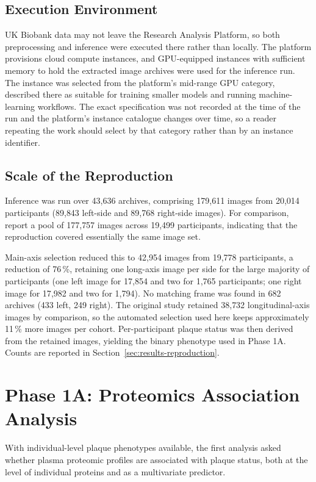 \subsection{Execution Environment}
UK Biobank data may not leave the Research Analysis Platform, so both preprocessing and inference
were executed there rather than locally. The platform provisions cloud compute instances, and
GPU-equipped instances with sufficient memory to hold the extracted image archives were used for
the inference run.
The instance was selected from the platform's mid-range GPU category, described there as
suitable for training smaller models and running machine-learning workflows. The exact
specification was not recorded at the time of the run and the platform's instance catalogue
changes over time, so a reader repeating the work should select by that category rather than by
an instance identifier.

\subsection{Scale of the Reproduction}
\label{subsec:reproduction-scale}
Inference was run over 43{,}636 archives, comprising 179{,}611 images from 20{,}014 participants
(89{,}843 left-side and 89{,}768 right-side images). For comparison, \textcite{omarov2024deep}
report a pool of 177{,}757 images across 19{,}499 participants, indicating that the reproduction
covered essentially the same image set.

Main-axis selection reduced this to 42{,}954 images from 19{,}778 participants, a reduction of
76\,\%, retaining one long-axis image per side for the large majority of participants (one left
image for 17{,}854 and two for 1{,}765 participants; one right image for 17{,}982 and two for
1{,}794). No matching frame was found in 682 archives (433 left, 249 right). The original study
retained 38{,}732 longitudinal-axis images by comparison, so the automated selection used here
keeps approximately 11\,\% more images per cohort. Per-participant plaque status was then derived
from the retained images, yielding the binary phenotype used in Phase 1A. Counts are reported in
Section~\ref{sec:results-reproduction}.

\section{Phase 1A: Proteomics Association Analysis}
\label{sec:phase1}

With individual-level plaque phenotypes available, the first analysis asked whether plasma
proteomic profiles are associated with plaque status, both at the level of individual proteins
and as a multivariate predictor.

